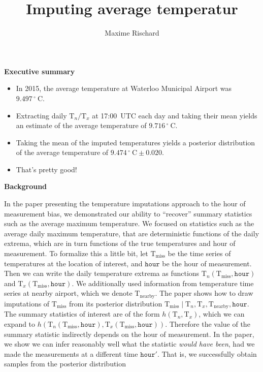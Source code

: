 \documentclass[letter]{article}
\title{
		Imputing average temperatur
		}
\author[*]{Maxime Rischard}
\affil[*]{Department of Statistics, Harvard University}
\providecommand{\tightlist}{%
      \setlength{\itemsep}{0pt}\setlength{\parskip}{0pt}}
\newcommand{\genericdel}[3]{%
      \left#1#3\right#2
    }
\newcommand{\del}[1]{\genericdel(){#1}}
\newcommand{\T}{\mathrm{T}}
\newcommand{\Tn}{\T_{n}}
\newcommand{\Tx}{\T_{x}}
\newcommand{\degreeC}{{}^{\circ}~\mathrm{C}}
\newcommand{\miss}{\mathrm{miss}}
\newcommand{\obs}{\mathrm{nearby}}
\newcommand{\hour}{\mathtt{hour}}
\providecommand{\tightlist}{%
  	  \setlength{\itemsep}{0pt}\setlength{\parskip}{0pt}}
\begin{document}
    
    
    
    \maketitle
    

    


    


        \textbf{Executive summary}

\begin{itemize}
\tightlist
\item
  In 2015, the average temperature at Waterloo Municipal Airport was \(9.497\,\degreeC\).
\item
  Extracting daily \(\Tn/\Tx\) at 17:00~UTC each day and taking their mean yields an estimate of the average temperature of \(9.716\,\degreeC\).
\item
  Taking the mean of the imputed temperatures yields a posterior distribution of the average temperature of \(9.474\,\degreeC \pm 0.020\).
\item
  That's pretty good!
\end{itemize}
    


        \textbf{Background}

In the paper presenting the temperature imputations approach to the hour of measurement bias, we demonstrated our ability to ``recover'' summary statistics such as the average maximum temperature.
We focused on statistics such as the average daily maximum temperature, that are deterministic functions of the daily extrema, which are in turn functions of the true temperatures and hour of measurement.
To formalize this a little bit, let \(\T_\miss\) be the time series of temperatures at the location of interest, and \(\hour\) be the hour of measurement.
Then we can write the daily temperature extrema as functions \(\Tn\del{\T_\miss, \hour}\) and \(\Tx\del{\T_\miss, \hour}\).
We additionally used information from temperature time series at nearby airport, which we denote \(\T_\obs\).
The paper shows how to draw imputations of \(\T_\miss\) from its posterior distribution \(\T_\miss \mid \Tn, \Tx, \T_\obs, \hour\).
The summary statistics of interest are of the form \(h\del{\Tn, \Tx}\), which we can expand to \(h\del{\Tn\del{\T_\miss, \hour}, \Tx\del{\T_\miss, \hour}}\).
Therefore the value of the summary statistic indirectly depends on the hour of measurement.
In the paper, we show we can infer reasonably well what the statistic \emph{would have been}, had we made the measurements at a different time \(\hour'\).
That is, we successfully obtain samples from the posterior distribution
\end{document}
